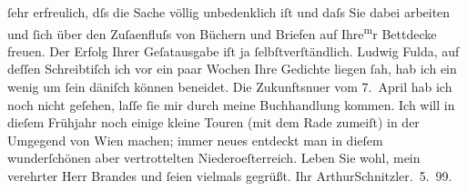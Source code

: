 \begin{ledgroupsized}[t]{13cm}
               ſehr erfreulich, dſs die Sache völlig unbedenklich iſt und daſs Sie dabei arbeiten
               und ſich über den Zuſa{\geminationm}enfluſs von Büchern und Briefen
               auf Ihre\substVorne{}\textsuperscript{m}\substDazwischen{}r\substHinten{} Bettdecke freuen. Der Erfolg Ihrer Geſa{\geminationm}tausgabe iſt ja
               ſelbſtverſtändlich. Ludwig Fulda, auf deſſen
               Schreibtiſch ich vor ein paar Wochen {\pb}Ihre Gedichte liegen ſah, hab ich
               ein wenig um ſein däniſch können beneidet. Die
                  Zukunftsnu{\geminationm}er vom
                  7. April hab ich noch nicht geſehen, laſſe ſie mir durch meine
               Buchhandlung kommen.\pend
           \pstart
           Ich will in dieſem Frühjahr noch einige kleine Touren (mit dem Rade zumeiſt) in der
               Umgegend von Wien machen; immer neues entdeckt man
               in dieſem wunderſchönen aber vertrottelten Niederoeſterreich.\pend
           \pstart
           {\pb}Leben Sie wohl, mein verehrter Herr Brandes und
               ſeien vielmals gegrüßt.\pend
           \pstart Ihr \spacefill\mbox{ArthurSchnitzler}\pend{}. 5. 99.\pend
           
         
         \endnumbering{}\end{ledgroupsized}  \newcommand{\dateiname}{L00917}\newcommand{\titel}{Arthur Schnitzler an Georg Brandes, 19. 5. 1899}\newcommand{\editorInnen}{Martin Anton Müller und Gerd-Hermann Susen}
      